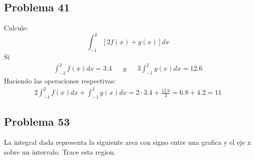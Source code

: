 \documentclass{article}
\begin{document}
      \subsection{Problema 41}
      Calcule:
      $$
      \int_{-1}^{2} [2f(x)+g(x)]dx
      $$
      Si
      \begin{align*}
        \int_{-1}^{2}f(x)dx = 3.4 && y && 3\int_{-1}^{2}g(x)dx=12.6
      \end{align*}
      Haciendo las operaciones respectivas:
      \begin{align*}
        2\int_{-1}^{2}f(x)dx + \int_{-1}^{2}g(x)dx = 2\cdot3.4 + \frac{12.6}{3} = 6.8 + 4.2 = 11
      \end{align*}
      \subsection{Problema 53}
      La integral dada representa la siguiente area con signo entre una grafica y el eje x sobre un intervalo. Trace esta region. \newline
      \begin{center}
      \end{center}
\end{document}
